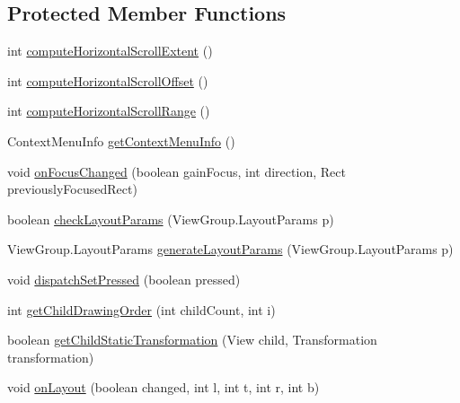 \subsection*{Protected Member Functions}
\begin{DoxyCompactItemize}
\item 
int \hyperlink{classcom_1_1zia_1_1freshdocs_1_1widget_1_1fileexplorer_1_1carousel_1_1_carousel_a4deafc0330354675eabe26bfa39c4733}{compute\-Horizontal\-Scroll\-Extent} ()
\item 
int \hyperlink{classcom_1_1zia_1_1freshdocs_1_1widget_1_1fileexplorer_1_1carousel_1_1_carousel_a70c64806dbe6f9c04a6da16656a2405c}{compute\-Horizontal\-Scroll\-Offset} ()
\item 
int \hyperlink{classcom_1_1zia_1_1freshdocs_1_1widget_1_1fileexplorer_1_1carousel_1_1_carousel_a1b8ca5d492fdc4f022fb08e33b570ae7}{compute\-Horizontal\-Scroll\-Range} ()
\item 
Context\-Menu\-Info \hyperlink{classcom_1_1zia_1_1freshdocs_1_1widget_1_1fileexplorer_1_1carousel_1_1_carousel_a6c140128ff27314d1fcc84461a568009}{get\-Context\-Menu\-Info} ()
\item 
void \hyperlink{classcom_1_1zia_1_1freshdocs_1_1widget_1_1fileexplorer_1_1carousel_1_1_carousel_a68e9a29d90ba91bd15955123a082d139}{on\-Focus\-Changed} (boolean gain\-Focus, int direction, Rect previously\-Focused\-Rect)
\item 
boolean \hyperlink{classcom_1_1zia_1_1freshdocs_1_1widget_1_1fileexplorer_1_1carousel_1_1_carousel_a7094f183d83c36ad3fa33b9b68790ace}{check\-Layout\-Params} (View\-Group.\-Layout\-Params p)
\item 
View\-Group.\-Layout\-Params \hyperlink{classcom_1_1zia_1_1freshdocs_1_1widget_1_1fileexplorer_1_1carousel_1_1_carousel_a6fb683e8515dc281bf8b28f37498d3bf}{generate\-Layout\-Params} (View\-Group.\-Layout\-Params p)
\item 
void \hyperlink{classcom_1_1zia_1_1freshdocs_1_1widget_1_1fileexplorer_1_1carousel_1_1_carousel_a201f2cce8c4e155fa3745d1208a03a2d}{dispatch\-Set\-Pressed} (boolean pressed)
\item 
int \hyperlink{classcom_1_1zia_1_1freshdocs_1_1widget_1_1fileexplorer_1_1carousel_1_1_carousel_a973fc26766c9a84125d87cdae1ee8b50}{get\-Child\-Drawing\-Order} (int child\-Count, int i)
\item 
boolean \hyperlink{classcom_1_1zia_1_1freshdocs_1_1widget_1_1fileexplorer_1_1carousel_1_1_carousel_acebace428ac8412cf699dfb671ef7be1}{get\-Child\-Static\-Transformation} (View child, Transformation transformation)
\item 
void \hyperlink{classcom_1_1zia_1_1freshdocs_1_1widget_1_1fileexplorer_1_1carousel_1_1_carousel_ad6972c85ad22063a57f0c07d6d8902d4}{on\-Layout} (boolean changed, int l, int t, int r, int b)
\end{DoxyCompactItemize}



